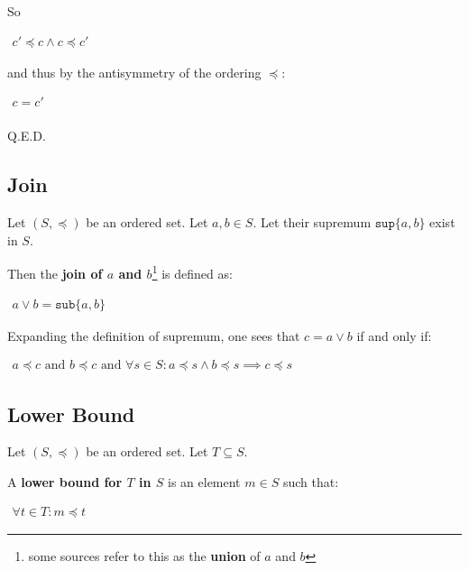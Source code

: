 So

\begin{math}
  \begin{array}{c}
    c' \preceq c \land c \preceq c'
  \end{array}
\end{math}

and thus by the antisymmetry of the ordering $\preceq$:

\begin{math}
  \begin{array}{c}
    c = c' \\
  \end{array}
\end{math}

Q.E.D.


\subsection{Join}
Let $(S, \preceq)$ be an ordered set. Let $a, b \in S$. Let their
supremum $\mathtt{sup} \{a, b\}$ exist in $S$.

Then the \textbf{join of $a$ and $b$}\footnote{some sources refer to
  this as the \textbf{union} of $a$ and $b$} is defined as:

\begin{math}
  \begin{array}{c}
    a \vee b = \mathtt{sub} \{ a, b \}
  \end{array}
\end{math}

Expanding the definition of supremum, one sees that $c = a \vee b$ if
and only if:

\begin{math}
  \begin{array}{c}
    a \preceq c\text{ and }b \preceq c\text{ and }\forall s \in S: a \preceq s \land b \preceq s \implies c \preceq s
  \end{array}
\end{math}



\subsection{Lower Bound}
Let $(S, \preceq)$ be an ordered set. Let $T \subseteq S$.

A \textbf{lower bound for $T$ in $S$} is an element $m \in S$ such that:

\begin{math}
  \begin{array}{c}
    \forall t \in T: m \preceq t
  \end{array}
\end{math}


